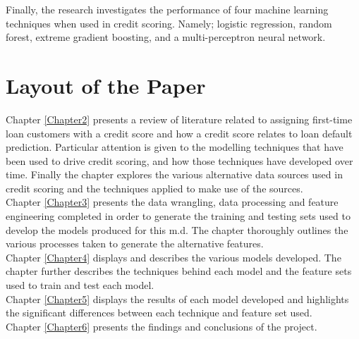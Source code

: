 Finally, the research investigates the performance of four machine learning techniques when used in credit scoring. Namely; logistic regression, random forest, extreme gradient boosting, and a multi-perceptron neural network. 

\section{Layout of the Paper}

Chapter \ref{Chapter2} presents a review of literature related to assigning first-time loan customers with a credit score and how a credit score relates to loan default prediction. Particular attention is given to the modelling techniques that have been used to drive credit scoring, and how those techniques have developed over time. Finally the chapter explores the various alternative data sources used in credit scoring and the techniques applied to make use of the sources. \\

Chapter \ref{Chapter3} presents the data wrangling, data processing and feature engineering completed in order to generate the training and testing sets used to develop the models produced for this m.d. The chapter thoroughly outlines the various processes taken to generate the alternative features. \\

Chapter \ref{Chapter4} displays and describes the various models developed. The chapter further describes the techniques behind each model and the feature sets used to train and test each model. \\

Chapter \ref{Chapter5} displays the results of each model developed and highlights the significant differences between each technique and  feature set used. \\

Chapter \ref{Chapter6} presents the findings and conclusions of the project. 


